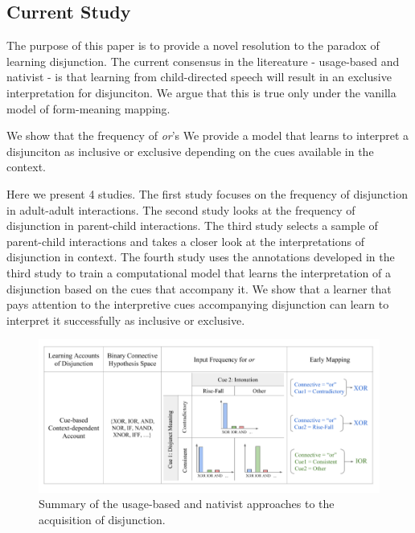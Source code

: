 \documentclass[floatsintext,man]{apa6}
\theoremstyle{definition}
\theoremstyle{definition}
\theoremstyle{definition}
\theoremstyle{remark}
\begin{document}
\subsection{Current Study}\label{current-study}

The purpose of this paper is to provide a novel resolution to the
paradox of learning disjunction. The current consensus in the
litereature - usage-based and nativist - is that learning from
child-directed speech will result in an exclusive interpretation for
disjunciton. We argue that this is true only under the vanilla model of
form-meaning mapping.

We show that the frequency of \emph{or}'s We provide a model that learns
to interpret a disjunciton as inclusive or exclusive depending on the
cues available in the context.

Here we present 4 studies. The first study focuses on the frequency of
disjunction in adult-adult interactions. The second study looks at the
frequency of disjunction in parent-child interactions. The third study
selects a sample of parent-child interactions and takes a closer look at
the interpretations of disjunction in context. The fourth study uses the
annotations developed in the third study to train a computational model
that learns the interpretation of a disjunction based on the cues that
accompany it. We show that a learner that pays attention to the
interpretive cues accompanying disjunction can learn to interpret it
successfully as inclusive or exclusive.

\begin{figure}[tb]

{\centering \includegraphics{figs/cueBasedAccount-1} 

}

\caption{Summary of the usage-based and nativist approaches to the acquisition of disjunction.}\label{fig:cueBasedAccount}
\end{figure}
\end{document}
